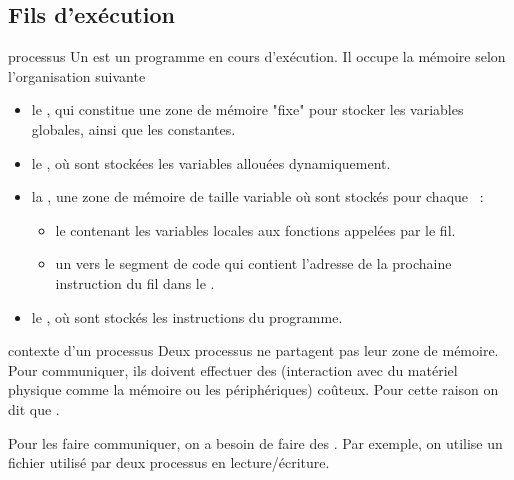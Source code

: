 

\begin{adjustwidth}{-3cm}{-3cm}

\setcounter{chapitre}{8}

\section{Fils d'exécution}

\begin{definition}{}{processus}
    Un  est un programme en cours d'exécution. Il occupe la mémoire selon l'organisation suivante~
    \begin{itemize}
        \item le , qui constitue une zone de mémoire "fixe" pour stocker les variables globales, ainsi que les constantes.
        \item le , où sont stockées les variables allouées dynamiquement.
        \item la , une zone de mémoire de taille variable où sont stockés pour chaque ~:
        \begin{itemize}
            \item le  contenant les variables locales aux fonctions appelées par le fil.
            \item un  vers le segment de code qui contient l'adresse de la prochaine instruction du fil dans le .
        \end{itemize}
        \item le , où sont stockés les instructions du programme.
    \end{itemize}
\end{definition}

\begin{remarque}{}{contexte d'un processus}
    Deux processus ne partagent pas leur zone de mémoire. Pour communiquer, ils doivent effectuer des  (interaction avec du matériel physique comme la mémoire ou les périphériques) coûteux. Pour cette raison on dit que .
\end{remarque}

\begin{remarque}{}{}
    Pour les faire communiquer, on a besoin de faire des . Par exemple, on utilise un fichier utilisé par deux processus en lecture/écriture.
\end{remarque}


\end{adjustwidth}
